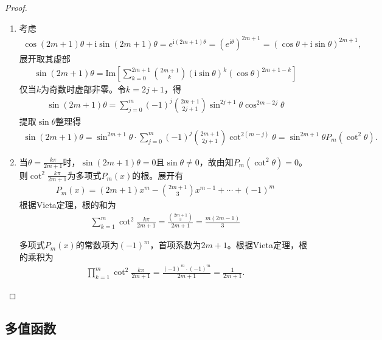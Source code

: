 \documentclass[../../main.tex]{subfiles}%
\begin{document}
\begin{proof}
\begin{enumerate}[(1)]
\item 考虑
\begin{align*}
\cos \left( 2m+1 \right) \theta +\mathrm{i}\sin \left( 2m+1 \right) \theta =e^{\mathrm{i}(2m+1)\theta}=(e^{\mathrm{i}\theta})^{2m+1}=\left( \cos \theta +\mathrm{i}\sin \theta \right) ^{2m+1},
\end{align*}
展开取其虚部
\begin{align*}
\sin(2m + 1)\theta = \mathrm{Im}\left[ \sum\limits_{k=0}^{2m+1} \binom{2m + 1}{k} (\mathrm{i}\sin\theta)^k(\cos\theta)^{2m+1-k} \right]
\end{align*}
仅当$k$为奇数时虚部非零。令$k = 2j + 1$，得
\begin{align*}
\sin(2m + 1)\theta = \sum\limits_{j=0}^{m}(-1)^j \binom{2m + 1}{2j + 1} \sin^{2j+1}\theta \cos^{2m-2j}\theta
\end{align*}
提取$\sin\theta$整理得
\begin{align*}
\sin(2m + 1)\theta = \sin^{2m+1}\theta \cdot \sum\limits_{j=0}^{m}(-1)^j \binom{2m + 1}{2j + 1} \cot^{2(m-j)}\theta = \sin^{2m+1}\theta P_m(\cot^2 \theta).
\end{align*}

\item 当$\theta = \frac{k\pi}{2m+1}$时，$\sin(2m+1)\theta = 0$且$\sin\theta \neq 0$，故由知$P_m(\cot^2 \theta) = 0$。则$\cot^2 \frac{k\pi}{2m+1}$为多项式$P_m(x)$的根。展开有
\begin{align*}
P_m(x) = (2m + 1)x^m - \binom{2m + 1}{3}x^{m-1} + \cdots + (-1)^m
\end{align*}
根据Vieta定理，根的和为
\begin{align*}
\sum\limits_{k=1}^{m} \cot^2 \frac{k\pi}{2m + 1} = \frac{\binom{2m+1}{3}}{2m + 1} = \frac{m(2m - 1)}{3}
\end{align*}

多项式$P_m(x)$的常数项为$(-1)^m$，首项系数为$2m + 1$。根据Vieta定理，根的乘积为
\begin{align*}
\prod\limits_{k=1}^{m} \cot^2 \frac{k\pi}{2m + 1} = \frac{(-1)^m \cdot (-1)^m}{2m + 1} = \frac{1}{2m + 1}.
\end{align*}
\end{enumerate}
\end{proof}




\subsection{多值函数}
\end{document}
